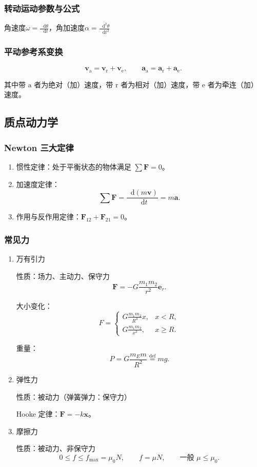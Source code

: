 \documentclass[UTF8,fontset=fandol,zihao=5]{ctexart}
\newcommand{\vect}[1]{\bm{#1}}
\newcommand{\dif}{\mathop{}\!\mathrm{d}}
\begin{document}
\subsubsection{转动运动参数与公式}

角速度$\omega=\frac{\dif\theta}{\dif t}$，角加速度$\alpha=\frac{\dif^2\theta}{\dif t^2}$

\subsubsection{平动参考系变换}

\[
  \vect v_{\mathrm a}=\vect v_{\mathrm r}+\vect v_{\mathrm e},
  \qquad
  \vect a_{\mathrm a}=\vect a_{\mathrm r}+\vect a_{\mathrm e}.
\]

其中带 \(\mathrm a\) 者为绝对（加）速度，带 \(\mathrm r\) 者为相对（加）速度，带 \(\mathrm e\) 者为牵连（加）速度。

\subsection{质点动力学}

\subsubsection{Newton 三大定律}

\begin{enumerate}
  \item 惯性定律：处于平衡状态的物体满足 \(\sum\vect F=0\)。
  \item 加速度定律：
  \[
    \sum\vect F=\frac{\dif(m\vect v)}{\dif t}=m\vect a.
  \]
  \item 作用与反作用定律：\(\vect F_{12}+\vect F_{21}=0\)。
\end{enumerate}

\subsubsection{常见力}

\begin{enumerate}
  \item 万有引力

  性质：场力、主动力、保守力
  \[
    \vect F=-G\frac{m_1m_2}{r^2}\vect e_r.
  \]

  大小变化：
  \[
    F=
    \begin{cases}
      \displaystyle G\frac{m_1m_2}{R^3}x, & x<R,\\[4pt]
      \displaystyle G\frac{m_1m_2}{x^2}, & x\ge R.
    \end{cases}
  \]

  重量：
  \[
    P=G\frac{m_Em}{R^2}\overset{\mathrm{def}}{=}mg.
  \]

  \item 弹性力

  性质：被动力（弹簧弹力：保守力）

  Hooke 定律：\(\vect F=-k\vect x\)。

  \item 摩擦力

  性质：被动力、非保守力
  \[
    0\le f\le f_{\max}=\mu_0N,
    \qquad
    f=\mu N,
    \qquad
    \text{一般 }\mu\le\mu_0.
  \]
\end{enumerate}
\end{document}
